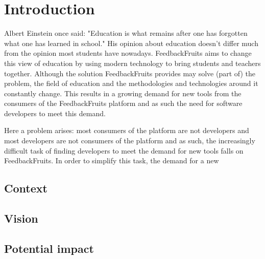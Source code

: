 \chapter{Introduction}

Albert Einstein once said: "Education is what remains after one has forgotten what one has learned in school." His opinion about education doesn't differ much from the opinion most students have nowadays. FeedbackFruits aims to change this view of education by using modern technology to bring students and teachers together. Although the solution FeedbackFruits provides may solve (part of) the problem, the field of education and the methodologies and technologies around it constantly change. This results in a growing demand for new tools from the consumers of the FeedbackFruits platform and as such the need for software developers to meet this demand.

Here a problem arises: most consumers of the platform are not developers and most developers are not consumers of the platform and as such, the increasingly difficult task of finding developers to meet the demand for new tools falls on FeedbackFruits. In order to simplify this task, the demand for a new 

\section{Context}

\section{Vision}

\section{Potential impact}